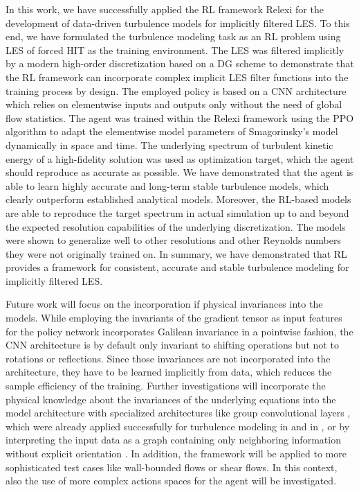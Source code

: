 In this work, we have successfully applied the RL framework Relexi \cite{kurz2022deep} for the development of data-driven turbulence models for implicitly filtered LES.
To this end, we have formulated the turbulence modeling task as an RL problem using LES of forced HIT as the training environment.
The LES was filtered implicitly by a modern high-order discretization based on a DG scheme to demonstrate that the RL framework can incorporate complex implicit LES filter functions into the training process by design.
The employed policy is based on a CNN architecture which relies on elementwise inputs and outputs only without the need of global flow statistics.
The agent was trained within the Relexi framework using the PPO algorithm to adapt the elementwise model parameters of Smagorinsky's model dynamically in space and time.
The underlying spectrum of turbulent kinetic energy of a high-fidelity solution was used as optimization target, which the agent should reproduce as accurate as possible.
We have demonstrated that the agent is able to learn highly accurate and long-term stable turbulence models, which clearly outperform established analytical models.
Moreover, the RL-based models are able to reproduce the target spectrum in actual simulation up to and beyond the expected resolution capabilities of the underlying discretization.
The models were shown to generalize well to other resolutions and other Reynolds numbers they were not originally trained on.
In summary, we have demonstrated that RL provides a framework for consistent, accurate and stable turbulence modeling for implicitly filtered LES.

Future work will focus on the incorporation if physical invariances into the models.
While employing the invariants of the gradient tensor as input features for the policy network incorporates Galilean invariance in a pointwise fashion, the CNN architecture is by default only invariant to shifting operations but not to rotations or reflections.
Since those invariances are not incorporated into the architecture, they have to be learned implicitly from data, which reduces the sample efficiency of the training.
Further investigations will incorporate the physical knowledge about the invariances of the underlying equations into the model architecture with specialized architectures like group convolutional layers \cite{cohen2016group}, which were already applied successfully for turbulence modeling in \cite{pawar2022frame} and in \cite{guan2023learning}, or by interpreting the input data as a graph containing only neighboring information without explicit orientation \cite{niepert2016learning,wu2020comprehensive}.
In addition, the framework will be applied to more sophisticated test cases like wall-bounded flows or shear flows.
In this context, also the use of more complex actions spaces for the agent will be investigated.


